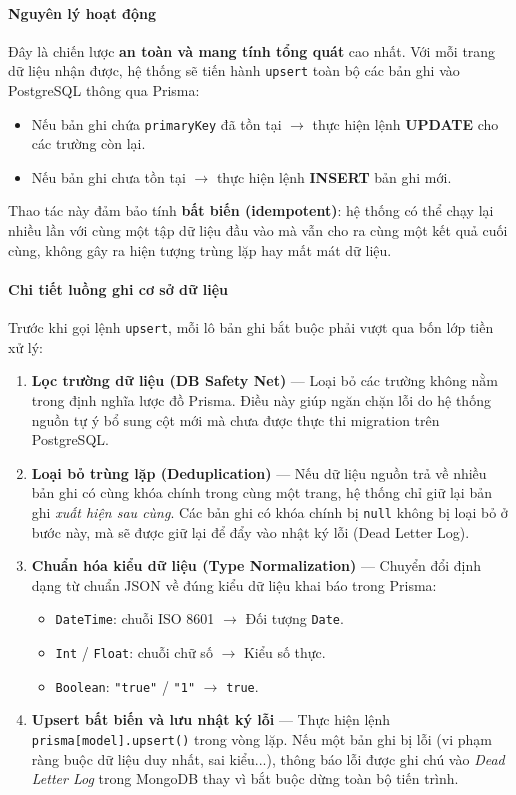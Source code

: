 \paragraph{Nguyên lý hoạt động}

Đây là chiến lược \textbf{an toàn và mang tính tổng quát} cao nhất. Với mỗi trang dữ liệu nhận được, hệ thống sẽ tiến hành \texttt{upsert} toàn bộ các bản ghi vào PostgreSQL thông qua Prisma:

\begin{itemize}
  \item Nếu bản ghi chứa \texttt{primaryKey} đã tồn tại $\rightarrow$ thực hiện lệnh \textbf{UPDATE} cho các trường còn lại.
  \item Nếu bản ghi chưa tồn tại $\rightarrow$ thực hiện lệnh \textbf{INSERT} bản ghi mới.
\end{itemize}

Thao tác này đảm bảo tính \textbf{bất biến (idempotent)}: hệ thống có thể chạy lại nhiều lần với cùng một tập dữ liệu đầu vào mà vẫn cho ra cùng một kết quả cuối cùng, không gây ra hiện tượng trùng lặp hay mất mát dữ liệu.

\paragraph{Chi tiết luồng ghi cơ sở dữ liệu}

Trước khi gọi lệnh \texttt{upsert}, mỗi lô bản ghi bắt buộc phải vượt qua bốn lớp tiền xử lý:

\begin{enumerate}
  \item \textbf{Lọc trường dữ liệu (DB Safety Net)} — Loại bỏ các trường không nằm trong định nghĩa lược đồ Prisma. Điều này giúp ngăn chặn lỗi do hệ thống nguồn tự ý bổ sung cột mới mà chưa được thực thi migration trên PostgreSQL.
  \item \textbf{Loại bỏ trùng lặp (Deduplication)} — Nếu dữ liệu nguồn trả về nhiều bản ghi có cùng khóa chính trong cùng một trang, hệ thống chỉ giữ lại bản ghi \textit{xuất hiện sau cùng}. Các bản ghi có khóa chính bị \texttt{null} không bị loại bỏ ở bước này, mà sẽ được giữ lại để đẩy vào nhật ký lỗi (Dead Letter Log).
  \item \textbf{Chuẩn hóa kiểu dữ liệu (Type Normalization)} — Chuyển đổi định dạng từ chuẩn JSON về đúng kiểu dữ liệu khai báo trong Prisma:
        \begin{itemize}
          \item \texttt{DateTime}: chuỗi ISO 8601 $\rightarrow$ Đối tượng \texttt{Date}.
          \item \texttt{Int} / \texttt{Float}: chuỗi chữ số $\rightarrow$ Kiểu số thực.
          \item \texttt{Boolean}: \texttt{"true"} / \texttt{"1"} $\rightarrow$ \texttt{true}.
        \end{itemize}
  \item \textbf{Upsert bất biến và lưu nhật ký lỗi} — Thực hiện lệnh \texttt{prisma[model].upsert()} trong vòng lặp. Nếu một bản ghi bị lỗi (vi phạm ràng buộc dữ liệu duy nhất, sai kiểu...), thông báo lỗi được ghi chú vào \textit{Dead Letter Log} trong MongoDB thay vì bắt buộc dừng toàn bộ tiến trình.
\end{enumerate}

